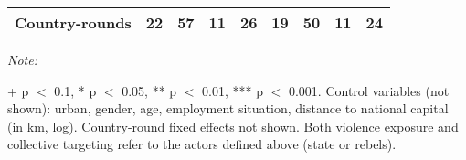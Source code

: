 \begin{table}[!h]
{\begin{threeparttable}
\begin{tabular}[t]{lcccccccc}
Country-rounds & 22 & 57 & 11 & 26 & 19 & 50 & 11 & 24\\
\bottomrule
\end{tabular}
\begin{tablenotes}[para]
\item \textit{Note: } 
\item + p $<$ 0.1, * p $<$ 0.05, ** p $<$ 0.01, *** p $<$ 0.001. Control variables (not shown): urban, gender, age, employment situation, distance to national capital (in km, log). Country-round fixed effects not shown. Both violence exposure and collective targeting refer to the actors defined above (state or rebels).
\end{tablenotes}
\end{threeparttable}}
\end{table}

